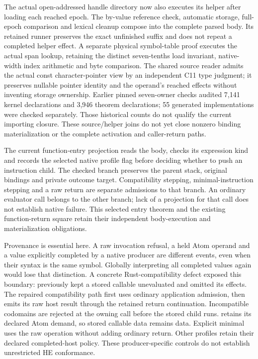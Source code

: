 \documentclass[11pt,a4paper]{article}
\newcommand{\code}[1]{\texttt{\detokenize{#1}}}
\begin{document}
The actual open-addressed handle directory now also executes its helper
after loading each reached epoch. The by-value reference check, automatic
storage, full-epoch comparison and lexical cleanup compose into the complete
parsed \code{find_ref} body. Its retained runner preserves the exact unfinished
suffix and does not repeat a completed helper effect. A separate physical
symbol-table proof executes the actual span lookup, retaining the distinct
seven-tenths load invariant, native-width index arithmetic and byte comparison.
The shared source reader admits the actual const character-pointer view by
an independent C11 type judgment; it preserves nullable pointer identity and
the operand's reached effects without inventing storage ownership. Earlier pinned
seven-owner checks audited 7,141 kernel declarations and 3,946 theorem
declarations; 55 generated implementations were checked separately. Those
historical counts do not qualify the current importing closure. These
source/helper joins do not yet close nonzero binding
materialization or the complete activation and caller-return paths.

The current function-entry projection reads the body, checks its expression
kind and records the selected native profile flag before deciding whether to
push an instruction child. The checked branch preserves the parent stack,
original bindings and private outcome target. Compatibility stepping,
minimal-instruction stepping and a raw return are separate admissions to
that branch. An ordinary evaluator call belongs to the other branch; lack
of a projection for that call does not establish native failure. This
selected entry theorem and the existing function-return square retain their
independent body-execution and materialization obligations.

Provenance is essential here. A raw invocation refusal, a held Atom operand
and a value explicitly completed by a native producer are different
events, even when their syntax is the same symbol. Globally interpreting
all completed values again would lose that distinction. A concrete
Rust-compatibility defect exposed this boundary: \code{get-state} previously
kept a stored callable unevaluated and omitted its effects. The repaired
compatibility path first uses ordinary application admission, then emits its
raw host result through the retained return continuation. Incompatible
codomains are rejected at the owning call before the stored child runs.
\code{get-atoms} retains its declared Atom demand, so stored callable data
remains data. Explicit minimal \code{eval} uses the raw operation without
adding ordinary return. Other profiles retain their declared completed-host
policy. These producer-specific controls do not establish unrestricted HE
conformance.
\end{document}
